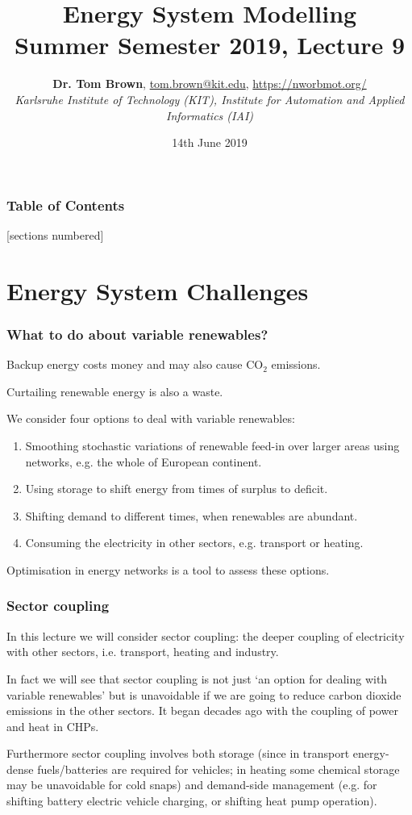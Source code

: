 \documentclass[10pt,aspectratio=169,dvipsnames]{beamer}
\title{Energy System Modelling\\ Summer Semester 2019, Lecture 9}
\author{
  {\bf Dr. Tom Brown}, \href{mailto:tom.brown@kit.edu}{tom.brown@kit.edu}, \url{https://nworbmot.org/}\\
  \emph{Karlsruhe Institute of Technology (KIT), Institute for Automation and Applied Informatics (IAI)}
}
\date{\vspace{.3cm}14th June 2019}
\let\olditem\item
\renewcommand{\item}{%
\olditem\vspace{5pt}}
\begin{document}
\maketitle


\begin{frame}

  \frametitle{Table of Contents}
  [sections numbered]
  \tableofcontents[hideallsubsections]
\end{frame}

\section{Energy System Challenges}


\begin{frame}
  \frametitle{What to do about variable renewables?}

  Backup energy costs money and may also cause CO${}_2$ emissions.

  Curtailing renewable energy is also a waste.

  We consider \alert{four options} to deal with variable renewables:
  \begin{enumerate}
  \item Smoothing stochastic variations of renewable feed-in over \alert{larger areas using networks}, e.g. the whole of European continent.
  \item Using \alert{storage} to shift energy from times of surplus to deficit.
  \item \alert{Shifting demand} to different times, when renewables are abundant.
    \item Consuming the electricity in \alert{other sectors}, e.g. transport or heating.
  \end{enumerate}

\alert{Optimisation} in energy networks is a tool to assess these options.

\end{frame}

\begin{frame}
  \frametitle{Sector coupling}

  In this lecture we will consider \alert{sector coupling}: the deeper
  coupling of electricity with other sectors, i.e. transport, heating
  and industry.

  In fact we will see that sector coupling is not just `an option for
  dealing with variable renewables' but is \alert{unavoidable} if we
  are going to reduce carbon dioxide emissions in the other
  sectors. It began decades ago with the coupling of power and
  heat in CHPs.

  Furthermore sector coupling involves both \alert{storage} (since in
  transport energy-dense fuels/batteries are required for vehicles; in
  heating some chemical storage may be unavoidable for cold snaps) and
  \alert{demand-side management} (e.g. for shifting battery electric
  vehicle charging, or shifting heat pump operation).


\end{frame}
\end{document}
